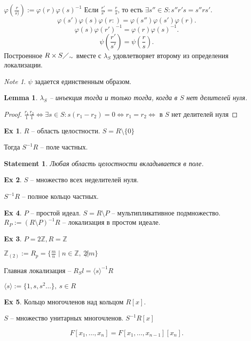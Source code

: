 \documentclass[11pt]{book}
\newcommand{\Z}{\mathbb{Z}}
\theoremstyle{definition}
\theoremstyle{plain}
\theoremstyle{plain}
\newtheorem*{lm}{Lemma}
\newtheorem*{st}{Statement}
\theoremstyle{definition}
\newtheorem*{ex}{Ex}
\theoremstyle{remark}
\newtheorem*{note}{Note}
\begin{document}
$ \varphi (\frac{r}{s)} ) := \varphi (r) \varphi (s) ^{-1}$
Если $ \frac{r'}{s'} = \frac{r}{s} $, то есть $ \exists  s'' \in  S: s'' r' s = s'' r s'$.
\[
    \varphi (s') \varphi (s) \varphi (r:) = \varphi (s'') \varphi (s') \varphi (r)
.\] 
\[
    \varphi (s) \varphi (r') ^{-1} = \varphi (r) \varphi (s)^{-1} 
.\] 
\[
    \psi(\frac{r'}{s'}) = \psi(\frac{r}{s})
.\] 
 Построенное $ R \times  S \diagup _{  \sim } $ вместе с $ \lambda _S$  удовлетворяет второму из определения локализации.
 \begin{note}
     $ \psi$ задается единственным образом.
 \end{note}
 \begin{lm}
     $ \lambda_S $ -- инъекция тогда и только тогда, когда  в $ S$ нет делителей нуля.
 \end{lm}
 \begin{proof}
     $ \frac{r_1}{1} \frac{r_2}{ 1} \Leftrightarrow  \exists  s \in  S : s (r_1 - r_2) = 0 \Leftrightarrow r_1 = r_2  \Leftrightarrow \text{ в }S \text{ нет делителей нуля}$
 \end{proof}
 \begin{ex}
     $ R$ -- область целостности.
     $ S = R \setminus \{0\}$
     
     Тогда $ S^{-1}R$ -- поле частных.

     \begin{st}
         Любая область целостности вкладывается в поле.
     \end{st}
 \end{ex}
 \begin{ex}
     $ S $ -- множество всех неделителей нуля.

     $ S^{-1} R$ -- полное кольцо частных.
 \end{ex}
 \begin{ex}
     $ P$ -- простой идеал. $ S = R \setminus P$ -- мультипликативное подмножество. 
     $
	 R_{P}:=(R \setminus P) ^{-1} R 
	 $ --  локализация в простом идеале.

	 \begin{ex}
	     $ P = 2 \Z, R = \Z$

	     $ \Z_{(2) }:= R _{p} = \{\frac{m}{n} \mid n \in  \Z, ~ 2 \not| m\}$
	 \end{ex}
 \end{ex}
 \begin{defn}
     Главная локализация -- $ R_S l= \langle s \rangle ^{-1 }R$

      $ \langle s \rangle:= \{1, s, s^2 \ldots \},  ~ s \in  R$
 \end{defn}
 \begin{ex}
     Кольцо многочленов над кольцом $ R[x]$.

     $ S$ -- множество унитарных многочленов.
     $ S^{-1}R[x]$ 

     \[
	 F[x_1, \ldots, x_n] = F[x_1, \ldots , x_{n-1}][x_n] 
     .\] 
 \end{ex}
\end{document}

